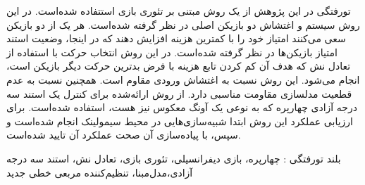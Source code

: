 


\pagestyle{empty}

\begin{وسط‌چین}
\end{وسط‌چین}

‌تورفتگی در این پژوهش از یک روش مبتنی بر تئوری بازی استتفاده شده‌است. در این روش سیستم و اغتشاش دو بازیکن اصلی در نظر گرفته شده‌است. هر یک از دو بازیکن سعی می‌کنند امتیاز خود را  با کمترین هزینه افزایش دهند که در اینجا،  وضعیت استند امتیاز بازیکن‌ها در نظر گرفته ‌شده‌است. در این روش انتخاب حرکت با استفاده از تعادل نش
 که هدف آن کم کردن تابع هزینه با فرض بدترین حرکت دیگر بازیکن است،  انجام می‌شود.
این روش نسبت به اغتشاش ورودی مقاوم است. همچنین نسبت به عدم قطعیت مدلسازی مقاومت مناسبی دارد. از روش ارائه‌شده برای کنترل یک استند سه درجه آزادی چهارپره که به نوعی یک آونگ معكوس نیز هست، استفاده شده‌است. 
برای ارزیابی عملکرد این روش ابتدا شبیه‌سازی‌هایی در محیط سیمولینک انجام شده‌است و سپس، با پیاده‌سازی آن صحت عملکرد آن تایید شده‌است. 

‌بلند
‌تورفتگی : 
چهارپره،  بازی دیفرانسیلی، تئوری بازی، تعادل نش، استند سه درجه آزادی،مدل‌مبنا، تنظیم‌کننده مربعی خطی 
‌جدید
